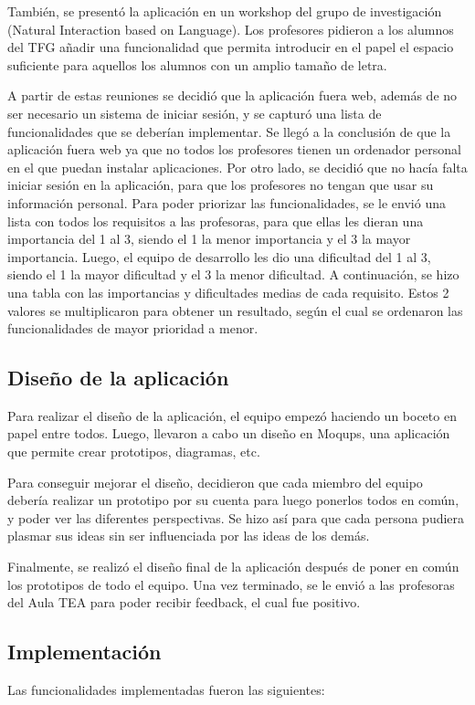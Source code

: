 También, se presentó la aplicación en un workshop del grupo de investigación (Natural Interaction based on Language). Los profesores pidieron a los alumnos del TFG añadir una funcionalidad que permita introducir en el papel el espacio suficiente para aquellos los alumnos con un amplio tamaño de letra.

A partir de estas reuniones se decidió que la aplicación fuera web, además de no ser necesario un sistema de iniciar sesión, y se capturó una lista de funcionalidades que se deberían implementar. Se llegó a la conclusión de que la aplicación fuera web ya que no todos los profesores tienen un ordenador personal en el que puedan instalar aplicaciones. Por otro lado, se decidió que no hacía falta iniciar sesión en la aplicación, para que los profesores no tengan que usar su información personal. Para poder priorizar las funcionalidades, se le envió una lista con todos los requisitos a las profesoras, para que ellas les dieran una importancia del 1 al 3, siendo el 1 la menor importancia y el 3 la mayor importancia. Luego, el equipo de desarrollo les dio una dificultad del 1 al 3, siendo el 1 la mayor dificultad y el 3 la menor dificultad. A continuación, se hizo una tabla con las importancias y dificultades medias de cada requisito. Estos 2 valores se multiplicaron para obtener un resultado, según el cual se ordenaron las funcionalidades de mayor prioridad a menor.


\subsection{Diseño de la aplicación}
Para realizar el diseño de la aplicación, el equipo empezó haciendo un boceto en papel entre todos. Luego, llevaron a cabo un diseño en Moqups,  una aplicación que permite crear prototipos, diagramas, etc.

Para conseguir mejorar el diseño, decidieron que cada miembro del equipo debería realizar un prototipo por su cuenta para luego ponerlos todos en común, y poder ver las diferentes perspectivas. Se hizo así para que cada persona pudiera plasmar sus ideas sin ser influenciada por las ideas de los demás.

Finalmente, se realizó el diseño final de la aplicación después de poner en común los prototipos de todo el equipo. Una vez terminado, se le envió a las profesoras del Aula TEA para poder recibir feedback, el cual fue positivo.


\subsection{Implementación}
Las funcionalidades implementadas fueron las siguientes:

